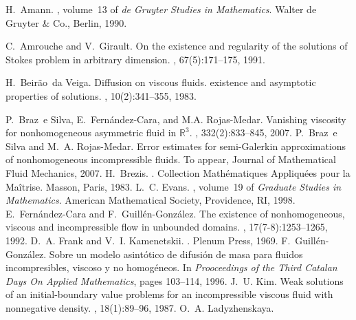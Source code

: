 \documentclass[11pt,a4paper]{article}
\begin{document}
\begin{thebibliography}{10}
H.~Amann.
, volume~13 of {\em de Gruyter Studies in Mathematics}.
\newblock Walter de Gruyter \& Co., Berlin, 1990.

C.~Amrouche and V.~Girault.
\newblock On the existence and regularity of the solutions of {S}tokes problem
  in arbitrary dimension.
, 67(5):171--175, 1991.

H.~Beir\~ao~da Veiga.
\newblock Diffusion on viscous fluids. existence and asymptotic properties of
  solutions.
, 10(2):341--355, 1983.

P.~Braz~e Silva, E.~Fern\'andez-Cara, and M.A. Rojas-Medar.
\newblock Vanishing viscosity for nonhomogeneous asymmetric fluid in
  $\mathbb{R}^3$.
,
  332(2):833--845, 2007.
P.~Braz~e Silva and M.~A. Rojas-Medar.
\newblock Error estimates for semi-{G}alerkin approximations of nonhomogeneous
  incompressible fluids.
\newblock To appear, Journal of Mathematical Fluid Mechanics, 2007.
H.~Brezis.
.
\newblock Collection Math\'ematiques Appliqu\'ees pour la Ma\^{i}trise. Masson,
  Paris, 1983.
L.~C. Evans.
, volume~19 of {\em Graduate
  Studies in Mathematics}.
\newblock American Mathematical Society, Providence, RI, 1998.
E.~Fern\'andez-Cara and F.~Guill\'en-Gonz\'alez.
\newblock The existence of nonhomogeneous, viscous and incompressible flow in
  unbounded domains.
, 17(7-8):1253--1265, 1992.
D.~A. Frank and V.~I. Kamenetskii.
.
\newblock Plenum Press, 1969.
F.~Guill\'en-Gonz\'alez.
\newblock Sobre un modelo asint\'otico de difusi\'on de masa para fluidos
  incompresibles, viscoso y no homog\'eneos.
\newblock In {\em Prooceedings of the Third Catalan Days On Applied
  Mathematics}, pages 103--114, 1996.
J.~U. Kim.
\newblock Weak solutions of an initial-boundary value problems for an
  incompressible viscous fluid with nonnegative density.
, 18(1):89--96, 1987.
O.~A. Ladyzhenskaya.

\end{thebibliography}
\end{document}
